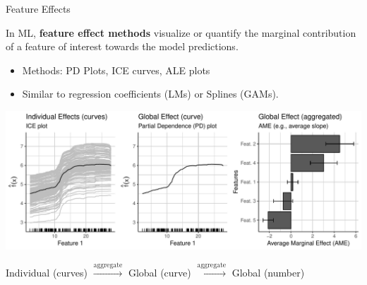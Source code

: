\documentclass[11pt,compress,t,notes=noshow, xcolor=table]{beamer}
\begin{document}
\begin{vbframe}{Feature Effects}

In ML, \textbf{feature effect methods} visualize or quantify the marginal contribution of a feature of interest towards the model predictions. %
\begin{itemize}
\item Methods: PD Plots, ICE curves, ALE plots
\item Similar to regression coefficients (LMs) or Splines (GAMs).
\end{itemize}

\centerline{\includegraphics[width=\textwidth]{figure_man/feature-effects.pdf}}

\hspace{8px} \small Individual (curves) \hspace{2px}
$\xrightarrow[]{\text{aggregate}}$ \hspace{2px} Global (curve) \hspace{2px}
$\xrightarrow[]{\text{aggregate}}$ \hspace{2px} Global (number)




\end{vbframe}
\end{document}
